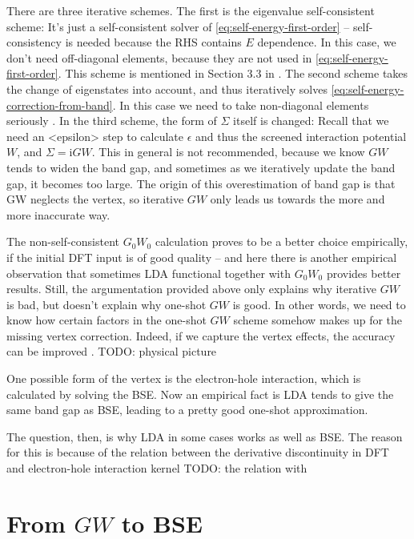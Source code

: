 \documentclass[hyperref, a4paper, 12pt]{report}
\newcommand*{\ii}{\mathrm{i}}
\def\texttt#1{<#1>}%
\newcommand{\shortcode}[1]{\texttt{#1}}
\begin{document}
There are three iterative schemes.
The first is the eigenvalue self-consistent scheme:
It's just a self-consistent solver of \eqref{eq:self-energy-first-order}
-- self-consistency is needed 
because the RHS contains $E$ dependence.
In this case, we don't need off-diagonal elements,
because they are not used in \eqref{eq:self-energy-first-order}.
This scheme is mentioned in Section 3.3 in \cite{berkeleygw}.
The second scheme takes the change of eigenstates into account,
and thus iteratively solves \eqref{eq:self-energy-correction-from-band}.
In this case we need to take non-diagonal elements seriously \cite{faleev2004all,aguilera2013g}.
In the third scheme, the form of $\Sigma$ itself is changed:
Recall that we need an \shortcode{epsilon} step to calculate $\epsilon$ 
and thus the screened interaction potential $W$, 
and $\Sigma = \ii G W$. 
This in general is not recommended,
because we know $GW$ tends to widen the band gap,
and sometimes as we iteratively update the band gap,
it becomes too large.
The origin of this overestimation of band gap is 
that GW neglects the vertex,
so iterative $GW$ only leads us towards the more and more inaccurate way. 

The non-self-consistent $G_0 W_0$ calculation proves to be a better choice empirically,
if the initial DFT input is of good quality -- 
and here there is another empirical observation that 
sometimes LDA functional together with $G_0 W_0$ provides better results.
Still, the argumentation provided above only explains why iterative $GW$ is bad, 
but doesn't explain why one-shot $GW$ is good. 
In other words, we need to know how certain factors 
in the one-shot $GW$ scheme somehow makes up for 
the missing vertex correction.
Indeed, if we capture the vertex effects, 
the accuracy can be improved 
\cite{PhysRevLett.99.246403}.
TODO: physical picture

One possible form of the vertex is the electron-hole interaction, which is calculated by solving the BSE. 
Now an empirical fact is  
LDA tends to give the same band gap as BSE, 
leading to a pretty good one-shot approximation. 

The question, then, is why LDA in some cases works as well as BSE.
The reason for this is because of the relation between the derivative discontinuity in DFT and electron-hole interaction kernel
TODO: the relation with \cite{perdew1982density}

\section{From $GW$ to BSE}
\end{document}

